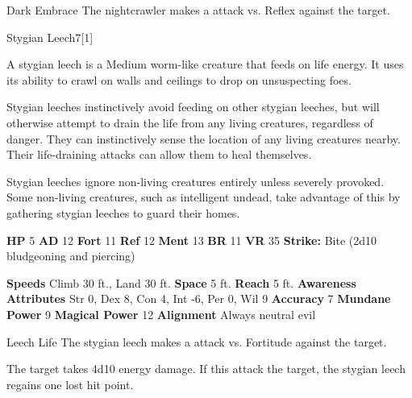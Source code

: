     \begin{freeability}{Dark Embrace}
       The nightcrawler makes a  attack
        vs. Reflex against the target.
    \end{freeability}
  
  \begin{monsection}{Stygian Leech}{7}[1]
    \vspace{-1em}\vspace{-1em}
    \vspace{0em}

    
    
        A stygian leech is a Medium worm-like creature that feeds on life energy.
        It uses its ability to crawl on walls and ceilings to drop on unsuspecting foes.
      
        Stygian leeches instinctively avoid feeding on other stygian leeches, but will otherwise attempt to drain the life from any living creatures, regardless of danger.
        They can instinctively sense the location of any living creatures nearby.
        Their life-draining attacks can allow them to heal themselves.
      
        Stygian leeches ignore non-living creatures entirely unless severely provoked.
        Some non-living creatures, such as intelligent undead, take advantage of this by gathering stygian leeches to guard their homes.
      

    \begin{spellcontent}
      \begin{spelltargetinginfo}
        \pari \textbf{HP} 5 \monsep
          \textbf{AD} 12 \monsep
          \textbf{Fort} 11 \monsep
          \textbf{Ref} 12 \monsep
          \textbf{Ment} 13
        \pari \textbf{BR} 11 \monsep
        \textbf{VR} 35
        \pari \textbf{Strike:}
            Bite  (2d10 bludgeoning and piercing)
      \end{spelltargetinginfo}
    \end{spellcontent}
    \begin{monsterfooter}
      \pari \textbf{Speeds} Climb 30 ft., Land 30 ft. \monsep
        \textbf{Space} 5 ft. \monsep
        \textbf{Reach} 5 ft.
      \pari \textbf{Awareness} 
      \pari \textbf{Attributes}
        Str 0, Dex 8,
        Con 4, Int -6,
        Per 0, Wil 9
      \pari \textbf{Accuracy} 7 \monsep
        \textbf{Mundane Power} 9 \monsep
      \textbf{Magical Power} 12
      \pari \textbf{Alignment} Always neutral evil
    \end{monsterfooter}
  \end{monsection}
  \begin{freeability}{Leech Life}
       The stygian leech makes a  attack
        vs. Fortitude against the target.
    
    \hit 
          The target takes 4d10 energy damage.
          If this attack  the target, the stygian leech regains one lost hit point.
    \end{freeability}
  
